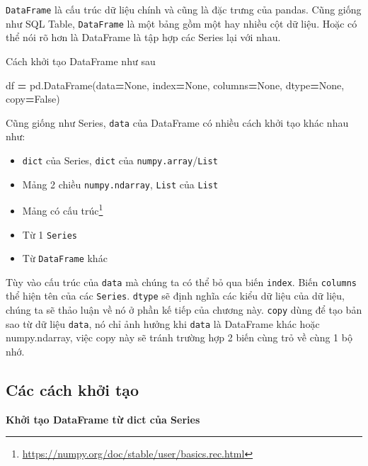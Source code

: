 \documentclass[
]{book}
\newenvironment{Shaded}{\begin{snugshade}}{\end{snugshade}}
\newcommand{\NormalTok}[1]{#1}
\newcommand{\OperatorTok}[1]{\textcolor[rgb]{0.81,0.36,0.00}{\textbf{#1}}}
\newcommand{\VariableTok}[1]{\textcolor[rgb]{0.00,0.00,0.00}{#1}}
\providecommand{\tightlist}{%
  \setlength{\itemsep}{0pt}\setlength{\parskip}{0pt}}
\renewcommand{\href}[2]{#2\footnote{\url{#1}}}
\begin{document}
\texttt{DataFrame} là cấu trúc dữ liệu chính và cũng là đặc trưng của pandas. Cũng giống như SQL Table,
\texttt{DataFrame} là một bảng gồm một hay nhiều cột dữ liệu. Hoặc có thể nói rõ hơn là DataFrame là tập
hợp các Series lại với nhau.

Cách khởi tạo DataFrame như sau

\begin{Shaded}
\begin{Highlighting}[]
\NormalTok{df }\OperatorTok{=}\NormalTok{ pd.DataFrame(data}\OperatorTok{=}\VariableTok{None}\NormalTok{, index}\OperatorTok{=}\VariableTok{None}\NormalTok{, columns}\OperatorTok{=}\VariableTok{None}\NormalTok{, dtype}\OperatorTok{=}\VariableTok{None}\NormalTok{, copy}\OperatorTok{=}\VariableTok{False}\NormalTok{)}
\end{Highlighting}
\end{Shaded}

Cũng giống như Series, \texttt{data} của DataFrame có nhiều cách khởi tạo khác nhau như:

\begin{itemize}
\tightlist
\item
  \texttt{dict} của Series, \texttt{dict} của \texttt{numpy.array}/\texttt{List}
\item
  Mảng 2 chiều \texttt{numpy.ndarray}, \texttt{List} của \texttt{List}
\item
  \href{https://numpy.org/doc/stable/user/basics.rec.html}{Mảng có cấu trúc}
\item
  Từ 1 \texttt{Series}
\item
  Từ \texttt{DataFrame} khác
\end{itemize}

Tùy vào cấu trúc của \texttt{data} mà chúng ta có thể bỏ qua biến \texttt{index}. Biến \texttt{columns} thể hiện tên
của các \texttt{Series}. \texttt{dtype} sẽ định nghĩa các kiểu dữ liệu của dữ liệu, chúng ta sẽ thảo luận về nó
ở phần kế tiếp của chương này. \texttt{copy} dùng để tạo bản sao từ dữ liệu \texttt{data}, nó chỉ ảnh hưởng khi
\texttt{data} là DataFrame khác hoặc numpy.ndarray, việc copy này sẽ tránh trường hợp 2 biến cùng trỏ về
cùng 1 bộ nhớ.

\hypertarget{cuxe1c-cuxe1ch-khux1edfi-tux1ea1o-1}{%
\subsection{Các cách khởi tạo}\label{cuxe1c-cuxe1ch-khux1edfi-tux1ea1o-1}}

\textbf{Khởi tạo DataFrame từ dict của Series}
\end{document}
